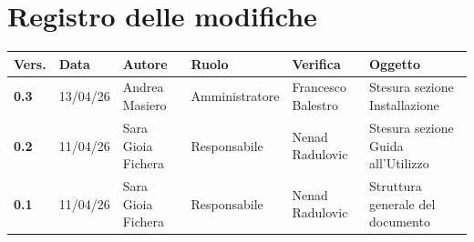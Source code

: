 \documentclass[a4paper,12pt]{article}
\begin{document}
    

    \section*{Registro delle modifiche} {
        \begin{table}[h!]
                \begin{tabularx}{\textwidth}{|l|l|l|l|L|L|}
                \hline
                \textbf{Vers.} & \textbf{Data} & \textbf{Autore} & \textbf{Ruolo} & \textbf{Verifica} & \textbf{Oggetto} \\
                \hline
                \textbf{0.3} & 13/04/26 & Andrea Masiero & Amministratore & Francesco Balestro & Stesura sezione Installazione\\
                \hline
                \textbf{0.2} & 11/04/26 & Sara Gioia Fichera & Responsabile & Nenad Radulovic & Stesura sezione Guida all'Utilizzo\\
                \hline
                \textbf{0.1} & 11/04/26 & Sara Gioia Fichera & Responsabile & Nenad Radulovic & Struttura generale del documento\\
                \hline
            \end{tabularx}
        \end{table}
    }
    \newpage
    
    \tableofcontents
    \newpage

    \listoffigures
    \newpage
    
    \listoftables
    \newpage
\end{document}
